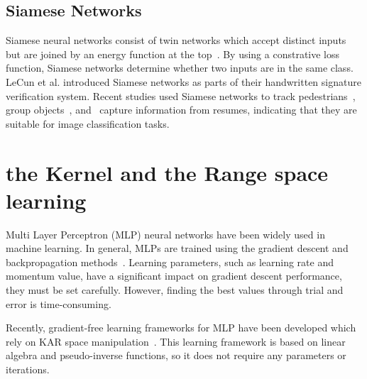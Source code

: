 \subsection{Siamese Networks}
Siamese neural networks consist of twin networks which accept distinct inputs but are joined by an energy function at the top~\cite{koch2015siamese}. By using a constrative loss function, Siamese networks determine whether two inputs are in the same class.
LeCun et al. introduced Siamese networks as parts of their handwritten signature verification system.
Recent studies used Siamese networks to track pedestrians~\cite{Leal-Taixe_2016_CVPR_Workshops}, group objects~\cite{mukherjee2018object}, and~\cite{maheshwary2018matching} capture information from resumes, indicating that they are suitable for image classification tasks.

\section{the Kernel and the Range space learning}
Multi Layer Perceptron (MLP) neural networks have been widely used in machine learning. In general, MLPs are trained using the gradient descent and backpropagation methods~\cite{goodfellow2016deep}.
Learning parameters, such as learning rate and momentum value, have a significant impact on gradient descent performance, they must be set carefully.
However, finding the best values through trial and error is time-consuming.

Recently, gradient-free learning frameworks for MLP have been developed which rely on KAR space manipulation~\cite{toh2018analytic,toh100,toh2018learning,toh2018gradient}.
This learning framework is based on linear algebra and pseudo-inverse functions, so it does not require any parameters or iterations.

